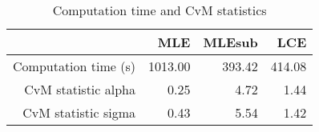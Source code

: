\begin{table}[ht]
\centering
\begin{tabular}{rrrr}
  \hline
 & MLE & MLEsub & LCE \\ 
  \hline
Computation time (s) & 1013.00 & 393.42 & 414.08 \\ 
  CvM statistic alpha & 0.25 & 4.72 & 1.44 \\ 
  CvM statistic sigma & 0.43 & 5.54 & 1.42 \\ 
   \hline
\end{tabular}
\caption{Computation time and CvM statistics} 
\label{tab:pareto:time:cvm}
\end{table}
